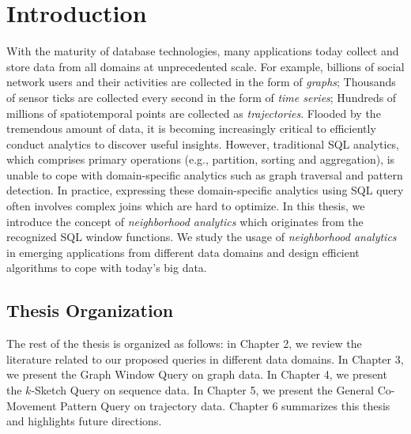 \chapter{Introduction}
With the maturity of database technologies, many applications today collect and store data from all domains 
at unprecedented scale. For example, billions of 
social network users and their activities are collected in the form
of \emph{graphs}; Thousands of sensor ticks are collected every second
in the form of \emph{time series}; Hundreds of millions of spatiotemporal points
are collected as \emph{trajectories}.
Flooded by the tremendous amount of data, 
it is becoming increasingly critical to efficiently
conduct analytics to discover useful insights.
However, traditional SQL analytics, which comprises 
primary operations (e.g., partition, sorting and aggregation),
is unable to cope  with domain-specific analytics 
such as graph traversal and   pattern detection. 
In practice, expressing these domain-specific 
analytics using SQL query often involves 
complex joins which are hard to optimize. 
In this thesis, we introduce the concept of \emph{neighborhood analytics} which
originates from the recognized SQL window functions. We study
the usage of \emph{neighborhood analytics} in emerging applications 
from different data domains
and design efficient algorithms to cope with today's big data.

%




 


\section{Thesis Organization}
The rest of the thesis is organized as follows: in Chapter 2, we review the literature related
to our proposed queries in different data domains.
In Chapter 3, we present the Graph Window Query on graph data. 
In Chapter 4, we present the $k$-Sketch Query on sequence data.
In Chapter 5, we present the General Co-Movement Pattern Query on trajectory data. 
Chapter 6 summarizes this thesis and highlights future directions.

